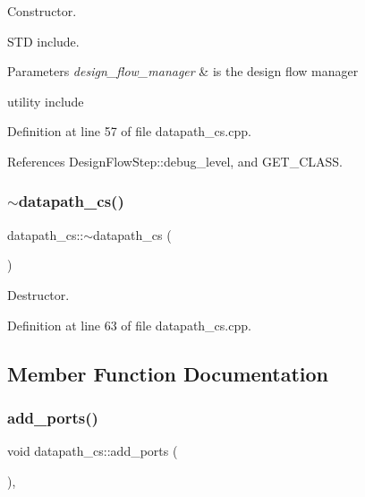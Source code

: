 Constructor. 

S\+TD include.


\begin{DoxyParams}{Parameters}
{\em design\+\_\+flow\+\_\+manager} & is the design flow manager\\
\hline
\end{DoxyParams}
utility include 

Definition at line 57 of file datapath\+\_\+cs.\+cpp.



References Design\+Flow\+Step\+::debug\+\_\+level, and G\+E\+T\+\_\+\+C\+L\+A\+SS.

\mbox{\label{classdatapath__cs_a8af0fe08d8def340585616268426cb54}} 
\subsubsection{\texorpdfstring{$\sim$datapath\+\_\+cs()}{~datapath\_cs()}}
{\footnotesize\ttfamily datapath\+\_\+cs\+::$\sim$datapath\+\_\+cs (\begin{DoxyParamCaption}{ }\end{DoxyParamCaption})\hspace{0.3cm}{\ttfamily [virtual]}}



Destructor. 



Definition at line 63 of file datapath\+\_\+cs.\+cpp.



\subsection{Member Function Documentation}
\mbox{\label{classdatapath__cs_af1a3075eb56ee8636b95a1c4114bbe70}} 
\subsubsection{\texorpdfstring{add\+\_\+ports()}{add\_ports()}}
{\footnotesize\ttfamily void datapath\+\_\+cs\+::add\+\_\+ports (\begin{DoxyParamCaption}{ }\end{DoxyParamCaption})\hspace{0.3cm}{\ttfamily [protected]}, {\ttfamily [virtual]}}



